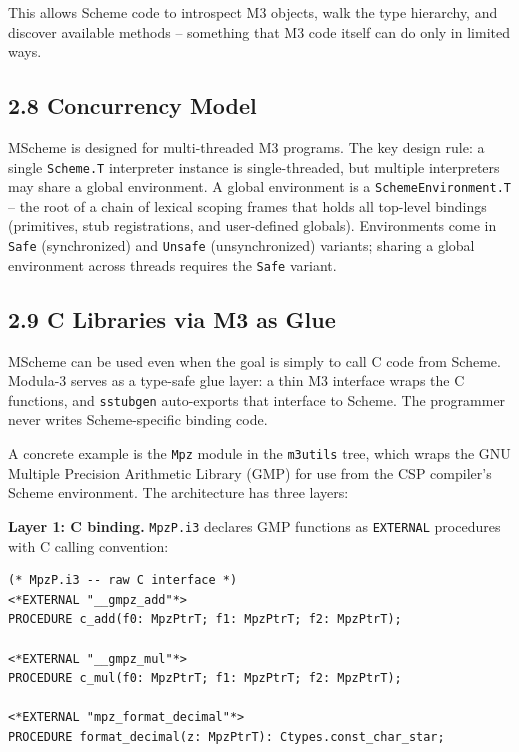 \documentclass[
  12pt,
]{report}
\newcommand{\passthrough}[1]{#1}
\begin{document}
This allows Scheme code to introspect M3 objects, walk the type
hierarchy, and discover available methods -- something that M3 code
itself can do only in limited ways.

\subsection{2.8 Concurrency Model}\label{concurrency-model}

MScheme is designed for multi-threaded M3 programs. The key design rule:
a single \passthrough{\lstinline!Scheme.T!} interpreter instance is
single-threaded, but multiple interpreters may share a global
environment. A global environment is a
\passthrough{\lstinline!SchemeEnvironment.T!} -- the root of a chain of
lexical scoping frames that holds all top-level bindings (primitives,
stub registrations, and user-defined globals). Environments come in
\passthrough{\lstinline!Safe!} (synchronized) and
\passthrough{\lstinline!Unsafe!} (unsynchronized) variants; sharing a
global environment across threads requires the
\passthrough{\lstinline!Safe!} variant.

\subsection{2.9 C Libraries via M3 as
Glue}\label{c-libraries-via-m3-as-glue}

MScheme can be used even when the goal is simply to call C code from
Scheme. Modula-3 serves as a type-safe glue layer: a thin M3 interface
wraps the C functions, and \passthrough{\lstinline!sstubgen!}
auto-exports that interface to Scheme. The programmer never writes
Scheme-specific binding code.

A concrete example is the \passthrough{\lstinline!Mpz!} module in the
\passthrough{\lstinline!m3utils!} tree, which wraps the GNU Multiple
Precision Arithmetic Library (GMP) for use from the CSP compiler's
Scheme environment. The architecture has three layers:

\textbf{Layer 1: C binding.} \passthrough{\lstinline!MpzP.i3!} declares
GMP functions as \passthrough{\lstinline!EXTERNAL!} procedures with C
calling convention:

\begin{lstlisting}
(* MpzP.i3 -- raw C interface *)
<*EXTERNAL "__gmpz_add"*>
PROCEDURE c_add(f0: MpzPtrT; f1: MpzPtrT; f2: MpzPtrT);

<*EXTERNAL "__gmpz_mul"*>
PROCEDURE c_mul(f0: MpzPtrT; f1: MpzPtrT; f2: MpzPtrT);

<*EXTERNAL "mpz_format_decimal"*>
PROCEDURE format_decimal(z: MpzPtrT): Ctypes.const_char_star;
\end{lstlisting}
\end{document}
